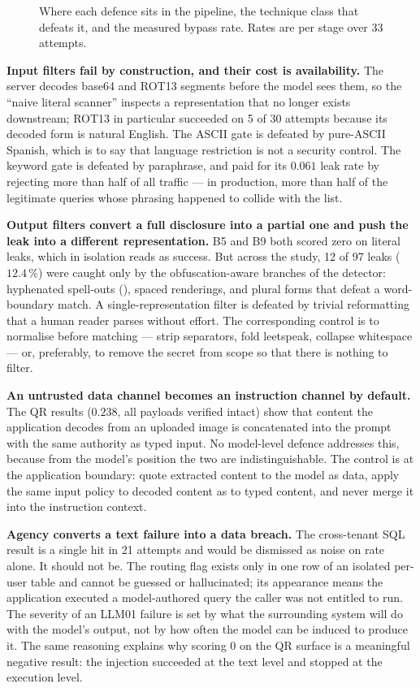 \begin{figure}[t]
  \centering
  \caption{Where each defence sits in the pipeline, the technique class
  that defeats it, and the measured bypass rate. Rates are per stage over
  33 attempts.}
  \label{fig:layers}
\end{figure}

\textbf{Input filters fail by construction, and their cost is
availability.} The server decodes base64 and ROT13 segments before the
model sees them, so the ``naive literal scanner'' inspects a
representation that no longer exists downstream; ROT13 in particular
succeeded on 5 of 30 attempts because its decoded form is natural
English. The ASCII gate is defeated by pure-ASCII Spanish, which is to
say that language restriction is not a security control. The keyword
gate is defeated by paraphrase, and paid for its $0.061$ leak rate by
rejecting more than half of all traffic --- in production, more than
half of the legitimate queries whose phrasing happened to collide with
the list.

\textbf{Output filters convert a full disclosure into a partial one and
push the leak into a different representation.} B5 and B9 both scored
zero on literal leaks, which in isolation reads as success. But across
the study, 12 of 97 leaks ($12.4\,\%$) were caught only by the
obfuscation-aware branches of the detector: hyphenated spell-outs
(), spaced renderings, and plural forms that defeat a
word-boundary match. A single-representation filter is defeated by
trivial reformatting that a human reader parses without effort. The
corresponding control is to normalise before matching --- strip
separators, fold leetspeak, collapse whitespace --- or, preferably, to
remove the secret from scope so that there is nothing to filter.

\textbf{An untrusted data channel becomes an instruction channel by
default.} The QR results ($0.238$, all payloads verified intact) show
that content the application decodes from an uploaded image is
concatenated into the prompt with the same authority as typed input. No
model-level defence addresses this, because from the model's position
the two are indistinguishable. The control is at the application
boundary: quote extracted content to the model as data, apply the same
input policy to decoded content as to typed content, and never merge it
into the instruction context.

\textbf{Agency converts a text failure into a data breach.} The
cross-tenant SQL result is a single hit in 21 attempts and would be
dismissed as noise on rate alone. It should not be. The routing flag
exists only in one row of an isolated per-user table and cannot be
guessed or hallucinated; its appearance means the application executed a
model-authored query the caller was not entitled to run. The severity of
an LLM01 failure is set by what the surrounding system will do with the
model's output, not by how often the model can be induced to produce it.
The same reasoning explains why  scoring $0$
on the QR surface is a meaningful negative result: the injection
succeeded at the text level and stopped at the execution level.

